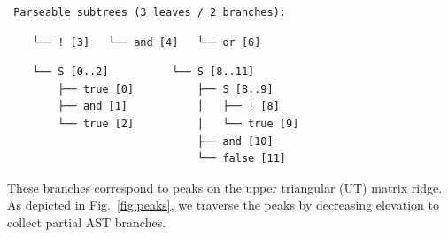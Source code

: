 \documentclass[sigplan,review,anonymous,acmsmall]{acmart}\settopmatter{printfolios=false,printccs=false,printacmref=false}
\begin{document}
    \begin{verbatim}
 Parseable subtrees (3 leaves / 2 branches):
    \end{verbatim}
    \noindent\hspace{0.64cm}\hspace{1.70cm}\hspace{1.98cm}\vspace{-5pt}
    \begin{verbatim}
    └── ! [3]   └── and [4]   └── or [6]
    \end{verbatim}
    \hspace{0.63cm}\hspace{3.4cm}\vspace{-5pt}
    \begin{verbatim}
    └── S [0..2]          └── S [8..11]
        ├── true [0]          ├── S [8..9]
        ├── and [1]           │   ├── ! [8]
        └── true [2]          │   └── true [9]
                              ├── and [10]
                              └── false [11]
    \end{verbatim}

    \noindent These branches correspond to peaks on the upper triangular (UT) matrix ridge. As depicted in Fig.~\ref{fig:peaks}, we traverse the peaks by decreasing elevation to collect partial AST branches.
\end{document}
